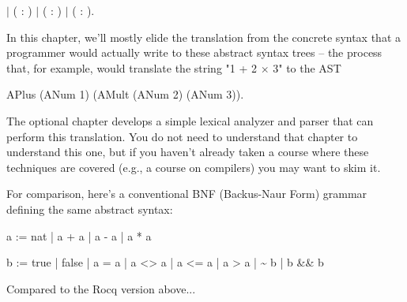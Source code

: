 \documentclass[12pt]{report}
\begin{document}
\begin{coqdoccode}
\coqdocindent{1.00em}
\ensuremath{|}  (  : )\coqdoceol
\coqdocindent{1.00em}
\ensuremath{|}  ( : )\coqdoceol
\coqdocindent{1.00em}
\ensuremath{|}  (  : ).\coqdoceol
\coqdocemptyline
\end{coqdoccode}
In this chapter, we'll mostly elide the translation from the
    concrete syntax that a programmer would actually write to these
    abstract syntax trees -- the process that, for example, would
    translate the string "1 + 2 \ensuremath{\times} 3" to the AST


      APlus (ANum 1) (AMult (ANum 2) (ANum 3)).


    The optional chapter  develops a simple lexical
    analyzer and parser that can perform this translation.  You do not
    need to understand that chapter to understand this one, but if you
    haven't already taken a course where these techniques are
    covered (e.g., a course on compilers) you may want to skim it. 

 For comparison, here's a conventional BNF (Backus-Naur Form)
    grammar defining the same abstract syntax:


    a := nat
        | a + a
        | a - a
        | a * a


    b := true
        | false
        | a = a
        | a <> a
        | a <= a
        | a > a
        | \~{} b
        | b \&\& b


 Compared to the Rocq version above...
\end{document}
